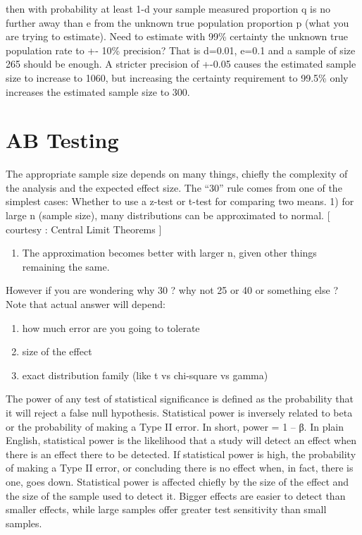 \documentclass[]{book}
\providecommand{\tightlist}{%
  \setlength{\itemsep}{0pt}\setlength{\parskip}{0pt}}
\begin{document}
then with probability at least 1-d your sample measured proportion q is
no further away than e from the unknown true population proportion p
(what you are trying to estimate). Need to estimate with 99\% certainty
the unknown true population rate to +- 10\% precision? That is d=0.01,
e=0.1 and a sample of size 265 should be enough. A stricter precision of
+-0.05 causes the estimated sample size to increase to 1060, but
increasing the certainty requirement to 99.5\% only increases the
estimated sample size to 300.

\section{AB Testing}\label{ab-testing}

The appropriate sample size depends on many things, chiefly the
complexity of the analysis and the expected effect size. The ``30'' rule
comes from one of the simplest cases: Whether to use a z-test or t-test
for comparing two means. 1) for large n (sample size), many
distributions can be approximated to normal. {[} courtesy : Central
Limit Theorems {]}

\begin{enumerate}
\def\labelenumi{\arabic{enumi})}
\setcounter{enumi}{1}
\tightlist
\item
  The approximation becomes better with larger n, given other things
  remaining the same.
\end{enumerate}

However if you are wondering why 30 ? why not 25 or 40 or something else
? Note that actual answer will depend:

\begin{enumerate}
\def\labelenumi{\arabic{enumi})}
\item
  how much error are you going to tolerate
\item
  size of the effect
\item
  exact distribution family (like t vs chi-square vs gamma)
\end{enumerate}

The power of any test of statistical significance is defined as the
probability that it will reject a false null hypothesis. Statistical
power is inversely related to beta or the probability of making a Type
II error. In short, power = 1 -- β. In plain English, statistical power
is the likelihood that a study will detect an effect when there is an
effect there to be detected. If statistical power is high, the
probability of making a Type II error, or concluding there is no effect
when, in fact, there is one, goes down. Statistical power is affected
chiefly by the size of the effect and the size of the sample used to
detect it. Bigger effects are easier to detect than smaller effects,
while large samples offer greater test sensitivity than small samples.
\end{document}
